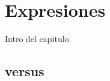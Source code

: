 \chapter{Expresiones}

\label{Chapter6}


Intro del capitulo


\section{\code{==} versus \code{===}}
